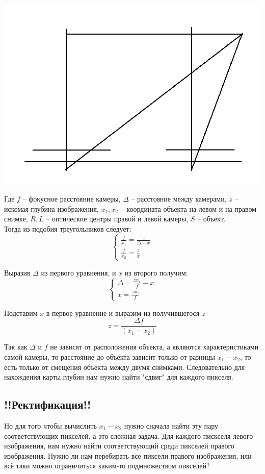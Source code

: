 		\includegraphics[scale = 0.75]{geometry5}
	
	Где $f$ -- фокусное расстояние камеры, $\Delta$ -- расстояние между камерами, $z$ -- искомая глубина изображения, $x_1, x_2$ -- координата объекта на левом и на правом снимке, $R, L$ -- оптические центры правой и левой камеры, $S$ -- объект.\\
	
	Тогда из подобия треугольников следует:\\
	$$\begin{cases} \frac{f}{x_1} = \frac{z}{\Delta + x} \\ \frac{f}{x_2} = \frac{z}{x} \end{cases}$$
	
	Выразив $\Delta$ из первого уравнения, и $x$ из второго получим:\\
	$$\begin{cases} \Delta = \frac{z x_1}{f} - x \\ x = \frac{zx_2}{f} \end{cases}$$
	
	Подставим $x$ в первое уравнение и выразим из получившегося $z$\\
	$$ z = \frac{\Delta f}{(x_1 - x_2)}$$
	
	Так как $\Delta$ и $f$ не зависят от расположения объекта, а являются характеристиками самой камеры, то расстояние до объекта зависит только от разницы $x_1 - x_2$, то есть только от смещения объекта между двумя снимками. Следовательно для нахождения карты глубин нам нужно найти "сдвиг" для каждого пикселя.\\
	
\subsection{!!Ректификация!!}	
	Но для того чтобы вычислить $x_1 - x_2$ нужно сначала найти эту пару соответствующих пикселей, а это сложная задача. Для каждого пискселя левого изображения, нам нужно найти соответствующий среди пикселей правого изображения. Нужно ли нам перебирать все пиксели правого изображения, или всё таки можно ограничиться каким-то подмножеством пикселей?\\
	
